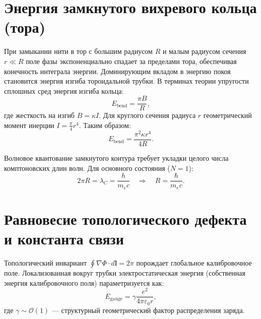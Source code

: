 \documentclass[12pt,a4paper]{article}
\begin{document}
\section{Энергия замкнутого вихревого кольца (тора)}

При замыкании нити в тор с большим радиусом $R$ и малым радиусом сечения $r \ll R$ поле фазы экспоненциально спадает за пределами тора, обеспечивая конечность интеграла энергии. Доминирующим вкладом в энергию покоя становится энергия изгиба тороидальной трубки. В терминах теории упругости сплошных сред энергия изгиба кольца:
\begin{equation}
E_{\text{bend}} = \frac{\pi B}{R},
\label{eq:bend_general}
\end{equation}
где жесткость на изгиб $B = \kappa I$. Для круглого сечения радиуса $r$ геометрический момент инерции $I = \frac{\pi}{4} r^4$. Таким образом:
\begin{equation}
E_{\text{bend}} = \frac{\pi^2 \kappa r^4}{4R}.
\label{eq:bend_energy}
\end{equation}

Волновое квантование замкнутого контура требует укладки целого числа комптоновских длин волн. Для основного состояния ($N=1$):
\begin{equation}
2\pi R = \lambda_C = \frac{h}{m_e c} \quad\Longrightarrow\quad R = \frac{\hbar}{m_e c}.
\label{eq:quantization}
\end{equation}

\section{Равновесие топологического дефекта и константа связи}

Топологический инвариант $\oint \nabla\Phi \cdot d\mathbf{l} = 2\pi$ порождает глобальное калибровочное поле. Локализованная вокруг трубки электростатическая энергия (собственная энергия калибровочного поля) параметризуется как:
\begin{equation}
E_{\text{gauge}} = \gamma \frac{e^2}{4\pi\varepsilon_0 r},
\label{eq:coulomb}
\end{equation}
где $\gamma \sim \mathcal{O}(1)$ — структурный геометрический фактор распределения заряда.
\end{document}
